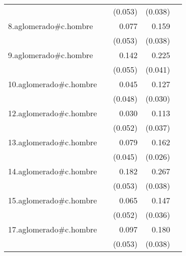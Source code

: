 {\begin{longtable}{l*{4}{D{.}{.}{-1}}}
            &                     &     (0.053)         &     (0.038)         &                     \\
\addlinespace
8.aglomerado#c.hombre&                     &       0.077         &       0.159\sym{***}&                     \\
            &                     &     (0.053)         &     (0.038)         &                     \\
\addlinespace
9.aglomerado#c.hombre&                     &       0.142\sym{**} &       0.225\sym{***}&                     \\
            &                     &     (0.055)         &     (0.041)         &                     \\
\addlinespace
10.aglomerado#c.hombre&                     &       0.045         &       0.127\sym{***}&                     \\
            &                     &     (0.048)         &     (0.030)         &                     \\
\addlinespace
12.aglomerado#c.hombre&                     &       0.030         &       0.113\sym{**} &                     \\
            &                     &     (0.052)         &     (0.037)         &                     \\
\addlinespace
13.aglomerado#c.hombre&                     &       0.079         &       0.162\sym{***}&                     \\
            &                     &     (0.045)         &     (0.026)         &                     \\
\addlinespace
14.aglomerado#c.hombre&                     &       0.182\sym{***}&       0.267\sym{***}&                     \\
            &                     &     (0.053)         &     (0.038)         &                     \\
\addlinespace
15.aglomerado#c.hombre&                     &       0.065         &       0.147\sym{***}&                     \\
            &                     &     (0.052)         &     (0.036)         &                     \\
\addlinespace
17.aglomerado#c.hombre&                     &       0.097         &       0.180\sym{***}&                     \\
            &                     &     (0.053)         &     (0.038)         &                     \\

\end{longtable}}
